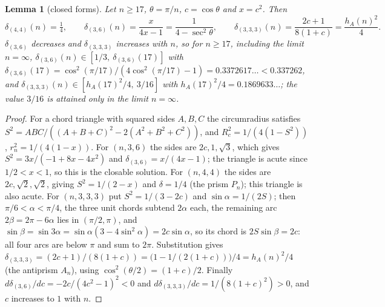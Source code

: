 \documentclass[11pt]{article}
\newtheorem{lemma}[theorem]{Lemma}
\theoremstyle{definition}
\theoremstyle{remark}
\begin{document}
\begin{appendices}
\begin{lemma}[closed forms]\label{lem:deltas}
Let $n\ge17$, $\theta=\pi/n$, $c=\cos\theta$ and $x=c^2$. Then
\[
\delta_{(4,4)}(n)=\tfrac14,\qquad
\delta_{(3,6)}(n)=\frac{x}{4x-1}=\frac{1}{4-\sec^2\theta},\qquad
\delta_{(3,3,3)}(n)=\frac{2c+1}{8(1+c)}=\frac{h_A(n)^2}{4}.
\]
$\delta_{(3,6)}$ decreases and $\delta_{(3,3,3)}$ increases with $n$, so
for $n\ge17$, including the limit $n=\infty$,
$\delta_{(3,6)}(n)\in[1/3,\ \delta_{(3,6)}(17)]$ with
$\delta_{(3,6)}(17)=\cos^2(\pi/17)/(4\cos^2(\pi/17)-1)=0.3372617\ldots<0.337262$,
and $\delta_{(3,3,3)}(n)\in[h_A(17)^2/4,\ 3/16]$ with
$h_A(17)^2/4=0.1869633\ldots$; the value $3/16$ is attained only in the
limit $n=\infty$.
\end{lemma}
\begin{proof}
For a chord triangle with squared sides $A,B,C$ the circumradius satisfies
$S^2=ABC/((A+B+C)^2-2(A^2+B^2+C^2))$, and $R_c^2=1/(4(1-S^2))$,
$r_n^2=1/(4(1-x))$. For $(n,3,6)$ the sides are $2c,1,\sqrt3$, which gives
$S^2=3x/(-1+8x-4x^2)$ and $\delta_{(3,6)}=x/(4x-1)$; the triangle is acute
since $1/2<x<1$, so this is the closable solution. For $(n,4,4)$ the sides
are $2c,\sqrt2,\sqrt2$, giving $S^2=1/(2-x)$ and $\delta=1/4$ (the prism
$P_n$); this triangle is also acute. For $(n,3,3,3)$ put $S^2=1/(3-2c)$
and $\sin\alpha=1/(2S)$; then $\pi/6<\alpha<\pi/4$, the three unit chords
subtend $2\alpha$ each, the remaining arc $2\beta=2\pi-6\alpha$ lies in
$(\pi/2,\pi)$, and $\sin\beta=\sin3\alpha=\sin\alpha(3-4\sin^2\alpha)=2c\sin\alpha$,
so its chord is $2S\sin\beta=2c$: all four arcs are below $\pi$ and sum to
$2\pi$. Substitution gives $\delta_{(3,3,3)}=(2c+1)/(8(1+c))
=\bigl(1-1/(2(1+c))\bigr)/4=h_A(n)^2/4$ (the antiprism $A_n$), using
$\cos^2(\theta/2)=(1+c)/2$. Finally
$d\delta_{(3,6)}/dc=-2c/(4c^2-1)^2<0$ and
$d\delta_{(3,3,3)}/dc=1/(8(1+c)^2)>0$, and $c$ increases to $1$ with $n$.
\end{proof}


\end{appendices}
\end{document}

